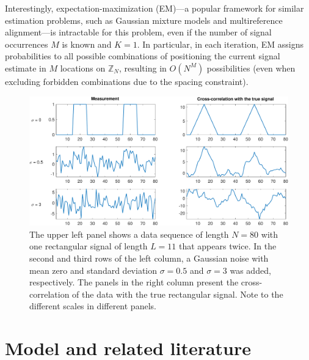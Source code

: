 \documentclass[english,11pt]{article}
\numberwithin{equation}{section}
\theoremstyle{plain}
\theoremstyle{definition}
\theoremstyle{remark}
\theoremstyle{plain}
\theoremstyle{remark}
\theoremstyle{plain}
\theoremstyle{plain}
\newcommand{\SNR}{{\textsf{SNR}}}
\begin{document}
Interestingly, expectation-maximization (EM)---a popular framework for similar estimation problems, such as Gaussian mixture models and multireference alignment---is intractable for this problem, even if the number of signal occurrences $M$ is known and $K=1$.
In particular, in each iteration, EM assigns probabilities to all possible combinations of positioning the current signal estimate in $M$ locations on $\mathbb{Z}_N$, resulting in $O(N^M)$ possibilities (even when excluding forbidden combinations due to the spacing constraint).


\begin{figure}
		\centering
		\includegraphics[scale=0.5]{XC_example}
		\caption{ The upper left panel shows a data sequence of length $N=80$ with one rectangular signal of length $L=11$ that appears twice. In the second and third rows of the left column, a Gaussian noise with mean zero and standard deviation $\sigma=0.5$ and $\sigma=3$ was added, respectively. The panels in the right column present the cross-correlation of the data with the true rectangular signal. Note to the different scales in different panels. }
    	\label{fig:XC_example}
\end{figure}




%


\section{Model and related literature}  \label{sec:model}
\end{document}
